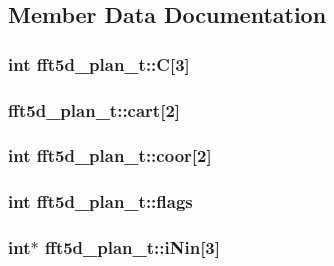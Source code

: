 \subsection{\-Member \-Data \-Documentation}
\hypertarget{structfft5d__plan__t_af3a6c2575835c87e0f74079c0ddaf227}{
\subsubsection[{\-C}]{\setlength{\rightskip}{0pt plus 5cm}int {\bf fft5d\-\_\-plan\-\_\-t\-::\-C}\mbox{[}3\mbox{]}}}\label{structfft5d__plan__t_af3a6c2575835c87e0f74079c0ddaf227}
\hypertarget{structfft5d__plan__t_ade00047d3c4d16e64c8abf1796744c34}{
\subsubsection[{cart}]{ {\bf fft5d\-\_\-plan\-\_\-t\-::cart}\mbox{[}2\mbox{]}}}\label{structfft5d__plan__t_ade00047d3c4d16e64c8abf1796744c34}
\hypertarget{structfft5d__plan__t_a073c93e15af341523c7466184a54e6c1}{
\subsubsection[{coor}]{\setlength{\rightskip}{0pt plus 5cm}int {\bf fft5d\-\_\-plan\-\_\-t\-::coor}\mbox{[}2\mbox{]}}}\label{structfft5d__plan__t_a073c93e15af341523c7466184a54e6c1}
\hypertarget{structfft5d__plan__t_a5d181d9af5f7ad6d572dd6713c6f1575}{
\subsubsection[{flags}]{\setlength{\rightskip}{0pt plus 5cm}int {\bf fft5d\-\_\-plan\-\_\-t\-::flags}}}\label{structfft5d__plan__t_a5d181d9af5f7ad6d572dd6713c6f1575}
\hypertarget{structfft5d__plan__t_af92d69340ad81229fb0d98274b82b7eb}{
\subsubsection[{i\-Nin}]{\setlength{\rightskip}{0pt plus 5cm}int$\ast$ {\bf fft5d\-\_\-plan\-\_\-t\-::i\-Nin}\mbox{[}3\mbox{]}}}\label{structfft5d__plan__t_af92d69340ad81229fb0d98274b82b7eb}
